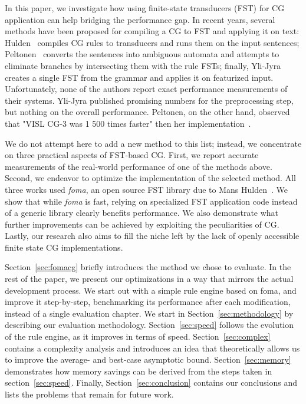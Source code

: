 \documentclass[11pt]{article}
\begin{document}
In this paper, we investigate how using finite-state transducers (FST) for CG
application can help bridging the performance gap. In recent years, several
methods have been proposed for compiling a CG to FST and applying it on text:
Hulden~ compiles CG rules to transducers and runs them on the
input sentences; Peltonen~ converts the sentences into ambiguous
automata and attempts to eliminate branches by intersecting them with the rule
FSTs; finally, Yli-Jyra~ creates a single FST from the
grammar and applies it on featurized input. Unfortunately, none of the authors
report exact performance measurements of their systems. Yli-Jyra published
promising numbers for the preprocessing step, but nothing on the overall
performance. Peltonen, on the other hand, observed that "VISL CG-3 was 1 500
times faster" then her implementation~\cite{Peltonen:2011}.

We do not attempt here to add a new method to this list; instead, we
concentrate on three practical aspects of FST-based CG. First, we report accurate
measurements of the real-world performance of one of the methods above. Second,
we endeavor to optimize the implementation of the selected method. All three
works used \emph{foma}, an open source FST library due to Mans
Hulden~. We show that while \emph{foma} is fast,
relying on specialized FST application code instead of a generic library
clearly benefits performance. We also demonstrate what further improvements can
be achieved by exploiting the peculiarities of CG. Lastly, our research also
aims to fill the niche left by the lack of openly accessible finite state CG
implementations.

Section~\ref{sec:fomacg} briefly introduces the method we chose to evaluate.
In the rest of the paper, we present our optimizations in a way that mirrors the
actual development process. We start out with a simple rule engine based on
foma, and improve it step-by-step, benchmarking its performance after each
modification, instead of a single evaluation chapter. We start in
Section~\ref{sec:methodology} by describing our evaluation methodology.
Section~\ref{sec:speed} follows the evolution of the rule engine, as it improves
in terms of speed. Section~\ref{sec:complex} contains a complexity analysis
and introduces an idea that theoretically allows us to improve the average- and
best-case asymptotic bound.
Section~\ref{sec:memory} demonstrates how memory savings can be derived from the
steps taken in section~\ref{sec:speed}. Finally, Section~\ref{sec:conclusion}
contains our conclusions and lists the problems that remain for future work.
\end{document}
